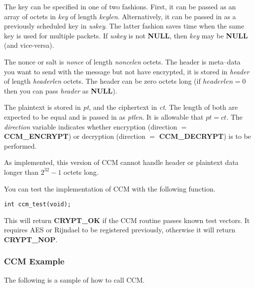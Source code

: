 \documentclass[synpaper]{book}
\begin{document}
The key can be specified in one of two fashions.  First, it can be passed as an array of octets in \textit{key} of length \textit{keylen}.  Alternatively,
it can be passed in as a previously scheduled key in \textit{uskey}.  The latter fashion saves time when the same key is used for multiple packets.  If
\textit{uskey} is not \textbf{NULL}, then \textit{key} may be \textbf{NULL} (and vice-versa).

The nonce or salt is \textit{nonce} of length \textit{noncelen} octets.  The header is meta--data you want to send with the message but not have
encrypted, it is stored in \textit{header} of length \textit{headerlen} octets.  The header can be zero octets long (if $headerlen = 0$ then
you can pass \textit{header} as \textbf{NULL}).

The plaintext is stored in \textit{pt}, and the ciphertext in \textit{ct}.  The length of both are expected to be equal and is passed in as \textit{ptlen}.  It is
allowable that $pt = ct$.  The \textit{direction} variable indicates whether encryption (direction $=$ \textbf{CCM\_ENCRYPT}) or
decryption (direction $=$ \textbf{CCM\_DECRYPT}) is to be performed.

As implemented, this version of CCM cannot handle header or plaintext data longer than $2^{32} - 1$ octets long.

You can test the implementation of CCM with the following function.

\begin{verbatim}
int ccm_test(void);
\end{verbatim}

This will return \textbf{CRYPT\_OK} if the CCM routine passes known test vectors.  It requires AES or Rijndael to be registered previously, otherwise it will
return \textbf{CRYPT\_NOP}.

\subsubsection{CCM Example}
The following is a sample of how to call CCM.
\end{document}
